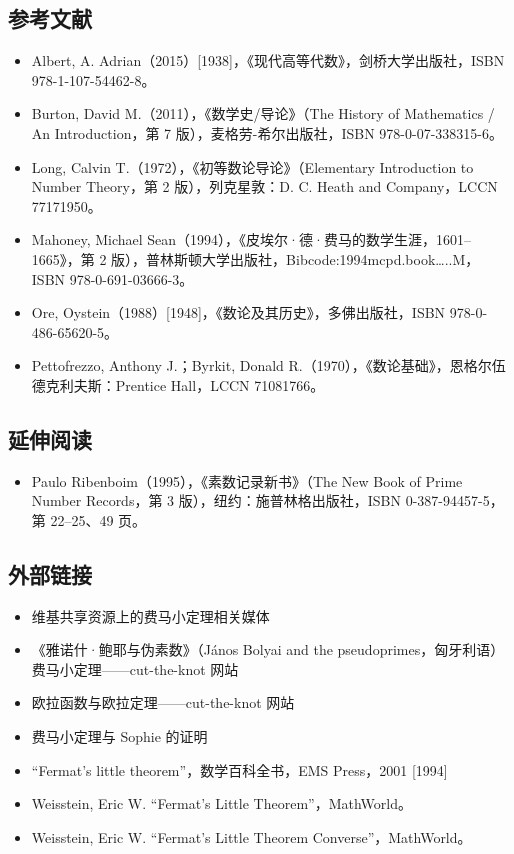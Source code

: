 \subsection{参考文献}
\begin{itemize}
\item Albert, A. Adrian（2015）[1938]，《现代高等代数》，剑桥大学出版社，ISBN 978-1-107-54462-8。
\item Burton, David M.（2011），《数学史/导论》（The History of Mathematics / An Introduction，第 7 版），麦格劳-希尔出版社，ISBN 978-0-07-338315-6。
\item Long, Calvin T.（1972），《初等数论导论》（Elementary Introduction to Number Theory，第 2 版），列克星敦：D. C. Heath and Company，LCCN 77171950。
\item Mahoney, Michael Sean（1994），《皮埃尔·德·费马的数学生涯，1601–1665》，第 2 版），普林斯顿大学出版社，Bibcode:1994mcpd.book…..M，ISBN 978-0-691-03666-3。
\item Ore, Oystein（1988）[1948]，《数论及其历史》，多佛出版社，ISBN 978-0-486-65620-5。
\item Pettofrezzo, Anthony J.；Byrkit, Donald R.（1970），《数论基础》，恩格尔伍德克利夫斯：Prentice Hall，LCCN 71081766。
\end{itemize}
\subsection{延伸阅读}
\begin{itemize}
\item Paulo Ribenboim（1995），《素数记录新书》（The New Book of Prime Number Records，第 3 版），纽约：施普林格出版社，ISBN 0-387-94457-5，第 22–25、49 页。
\end{itemize}
\subsection{外部链接}
\begin{itemize}
\item 维基共享资源上的费马小定理相关媒体
\item 《雅诺什·鲍耶与伪素数》（János Bolyai and the pseudoprimes，匈牙利语）
费马小定理——cut-the-knot 网站
\item 欧拉函数与欧拉定理——cut-the-knot 网站
\item 费马小定理与 Sophie 的证明
\item “Fermat's little theorem”，数学百科全书，EMS Press，2001 [1994]
\item Weisstein, Eric W. “Fermat's Little Theorem”，MathWorld。
\item Weisstein, Eric W. “Fermat's Little Theorem Converse”，MathWorld。
\end{itemize}
